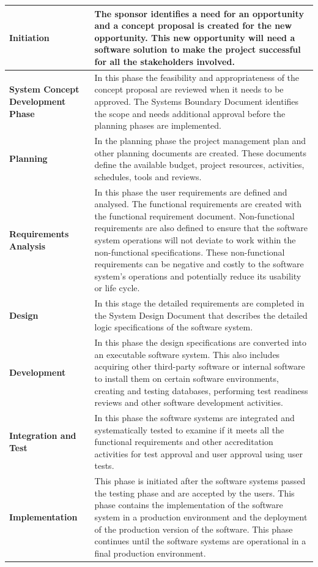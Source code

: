 \begin{xltabular}{\textwidth}{|l|X|}
	\textbf{Initiation} & The sponsor identifies a need for an opportunity and a concept proposal is created for the new opportunity. This new opportunity will need a software solution to make the project successful for all the stakeholders involved.\\ \hline
	\textbf{System Concept Development Phase} & In this phase the feasibility and appropriateness of the concept proposal are reviewed when it needs to be approved. The Systems Boundary Document identifies the scope and needs additional approval before the planning phases are implemented.   \\ \hline
	\textbf{Planning} & In the planning phase the project management plan and other planning documents are created. These documents define the available budget, project resources, activities, schedules, tools and reviews.  \\ \hline
	\textbf{Requirements Analysis} & In this phase the user requirements are defined and analysed. The functional requirements are created with the functional requirement document. Non-functional requirements are also defined to ensure that the software system operations will not deviate to work within the non-functional specifications. These non-functional requirements can be negative and costly to the software system's operations and potentially reduce its usability or life cycle. \\ \hline
	\textbf{Design} & In this stage the detailed requirements are completed in the System Design Document that describes the detailed logic specifications of the software system. \\ \hline
	\textbf{Development} & In this phase the design specifications are converted into an executable software system. This also includes acquiring other third-party software or internal software to install them on certain software environments, creating and testing databases, performing test readiness reviews and other software development activities. \\ \hline
	\textbf{Integration and Test} & In this phase the software systems are integrated and systematically tested to examine if it meets all the functional requirements and other accreditation activities for test approval and user approval using user tests.  \\ \hline
	\textbf{Implementation} & This phase is initiated after the software systems passed the testing phase and are accepted by the users. This phase contains the implementation of the software system in a production environment and the deployment of the production version of the software. This phase continues until the software systems are operational in a final production environment.\\ \hline

\end{xltabular}
